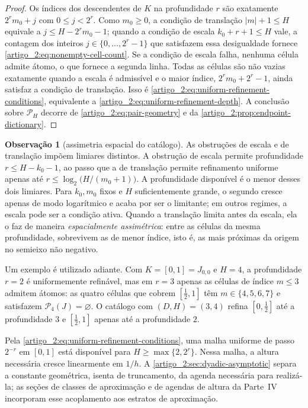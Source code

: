 \documentclass[12pt,a4paper]{article}
\theoremstyle{preciso}
\theoremstyle{definition}
\newcommand{\Pairs}{\mathcal{P}}
\theoremstyle{preciso}
\theoremstyle{preciso}
\theoremstyle{preciso}
\theoremstyle{preciso}
\theoremstyle{definition}
\theoremstyle{preciso}
\theoremstyle{definition}
\newtheorem{remark}[teorema]{Observação}
\theoremstyle{preciso}
\theoremstyle{preciso}
\theoremstyle{definition}
\begin{document}
\begin{proof}
Os índices dos descendentes de $K$ na profundidade $r$ são exatamente
$2^rm_0+j$ com $0\le j<2^r$. Como $m_0\ge0$, a condição de translação
$|m|+1\le H$ equivale a $j\le H-2^rm_0-1$; quando a condição de escala
$k_0+r+1\le H$ vale, a contagem dos inteiros $j\in\{0,\ldots,2^r-1\}$ que
satisfazem essa desigualdade fornece \eqref{artigo_2:eq:nonempty-cell-count}. Se a condição
de escala falha, nenhuma célula admite átomo, o que fornece a segunda linha.
Todas as células são não vazias exatamente quando a escala é admissível e o
maior índice, $2^rm_0+2^r-1$, ainda satisfaz a condição de translação. Isso é
\eqref{artigo_2:eq:uniform-refinement-conditions}, equivalente a
\eqref{artigo_2:eq:uniform-refinement-depth}. A conclusão sobre $\Pairs_H$ decorre de
\eqref{artigo_2:eq:pair-geometry} e da \cref{artigo_2:prop:endpoint-dictionary}.
\end{proof}

\begin{remark}[assimetria espacial do catálogo]\label{map:artigo_2:4.6}
\label{artigo_2:rem:asymmetry}
As obstruções de escala e de translação impõem limiares distintos. A obstrução de escala permite profundidade
$r\le H-k_0-1$, ao passo que a de translação permite refinamento uniforme apenas
até $r\le\log_2\bigl(H/(m_0+1)\bigr)$. A profundidade disponível é o menor
desses dois limiares. Para $k_0,m_0$ fixos e $H$ suficientemente grande, o
segundo cresce apenas de modo logarítmico e acaba por ser o limitante; em
outros regimes, a escala pode ser a condição ativa. Quando a translação
limita antes da escala, ela o faz de maneira \emph{espacialmente assimétrica}:
entre as células da mesma profundidade, sobrevivem as de menor índice, isto é,
as mais próximas da origem no semieixo não negativo.

Um exemplo é utilizado adiante. Com $K=[0,1]=J_{0,0}$ e $H=4$, a profundidade
$r=2$ é uniformemente refinável, mas em $r=3$ apenas as células de índice
$m\le3$ admitem átomos: as quatro células que cobrem $[\tfrac12,1]$ têm
$m\in\{4,5,6,7\}$ e satisfazem $\Pairs_4(J)=\varnothing$. O catálogo com
$(D,H)=(3,4)$ refina $[0,\tfrac12]$ até a profundidade $3$ e
$[\tfrac12,1]$ apenas até a profundidade $2$.

Pela \eqref{artigo_2:eq:uniform-refinement-conditions}, uma malha uniforme de passo
$2^{-r}$ em $[0,1]$ está disponível para
$H\ge\max\{2,2^r\}$. Nessa malha, a altura necessária cresce linearmente em $1/h$. A \cref{artigo_2:sec:dyadic-asymptotic} separa a constante geométrica, isenta de
truncamento, da agenda necessária para realizá-la; as
seções de classes de aproximação e de agendas de altura da Parte~IV incorporam esse acoplamento
aos estratos de aproximação.
\end{remark}
\end{document}
